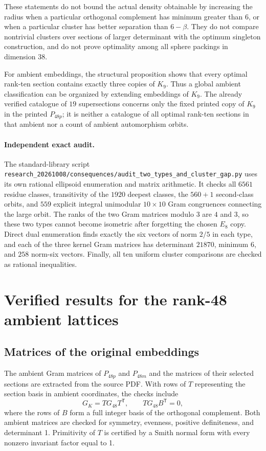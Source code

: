 \documentclass[11pt,a4paper]{article}
\theoremstyle{remark}\newtheorem{remark}[theorem]{Remark}
\newcommand{\file}[1]{{\small\nolinkurl{#1}}}
\begin{document}
These statements do not bound the actual density obtainable by increasing
the radius when a particular orthogonal complement has minimum greater
than $6$, or when a particular cluster has better separation than
$6-\beta$. They do not compare nontrivial clusters over sections of
larger determinant with the optimum singleton construction, and do not
prove optimality among all sphere packings in dimension $38$.

For ambient embeddings, the structural proposition shows that every
optimal rank-ten section contains exactly three copies of $K_9$.
Thus a global ambient classification can be organized by extending
embeddings of $K_9$. The already verified catalogue of $19$ supersections
concerns only the fixed printed copy of $K_9$ in the printed $P_{48p}$;
it is neither a catalogue of all optimal rank-ten sections in that ambient
nor a count of ambient automorphism orbits.

\paragraph{Independent exact audit.}
The standard-library script
\file{research_20261008/consequences/audit_two_types_and_cluster_gap.py}
uses its own rational ellipsoid enumeration and matrix arithmetic.
It checks all $6561$ residue classes, transitivity of the $1920$ deepest
classes, the $560+1$ second-class orbits, and $559$ explicit integral
unimodular $10\times10$ Gram congruences connecting the large orbit.
The ranks of the two Gram matrices modulo $3$ are $4$ and $3$, so these
two types cannot become isometric after forgetting the chosen $E_8$ copy.
Direct dual enumeration finds exactly the six vectors of norm $2/5$ in
each type, and each of the three kernel Gram matrices has determinant
$21870$, minimum $6$, and $258$ norm-six vectors. Finally, all ten
uniform cluster comparisons are checked as rational inequalities.

\section{Verified results for the rank-48 ambient lattices}

\subsection{Matrices of the original embeddings}

The ambient Gram matrices of $P_{48p}$ and $P_{48m}$ and the matrices of their selected sections are extracted from the source PDF. With rows of $T$ representing the section basis in ambient coordinates, the checks include
\[
G_K=T G_{48}T^{\mathsf T},\qquad
T G_{48}B^{\mathsf T}=0,
\]
where the rows of $B$ form a full integer basis of the orthogonal complement. Both ambient matrices are checked for symmetry, evenness, positive definiteness, and determinant 1. Primitivity of $T$ is certified by a Smith normal form with every nonzero invariant factor equal to 1.
\end{document}
